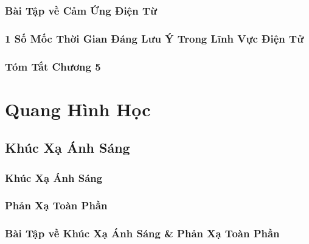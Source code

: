 \documentclass[oneside]{book}
\numberwithin{equation}{section}
\begin{document}

\section{Bài Tập về Cảm Ứng Điện Từ}


\section{1 Số Mốc Thời Gian Đáng Lưu Ý Trong Lĩnh Vực Điện Tử}


\section{Tóm Tắt Chương 5}


\part{Quang Hình Học}

\chapter{Khúc Xạ Ánh Sáng}

\section{Khúc Xạ Ánh Sáng}


\section{Phản Xạ Toàn Phần}


\section{Bài Tập về Khúc Xạ Ánh Sáng \& Phản Xạ Toàn Phần}
\end{document}
